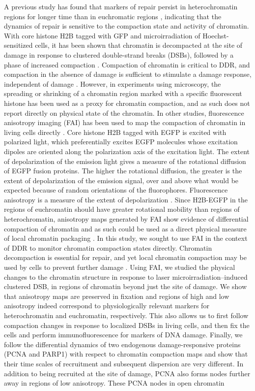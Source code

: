 A previous study has found that markers of repair persist in heterochromatin regions for longer time than in euchromatic regions \cite{goodarzi2008atm}, indicating that the dynamics of repair is sensitive to the compaction state and activity of chromatin. With core histone H2B tagged with GFP and microirradiation of Hoechst-sensitized cells, it has been shown that chromatin is decompacted at the site of damage in response to clustered double-strand breaks (DSBs), followed by a phase of increased compaction \cite{kruhlak2006changes,strickfaden2016poly}. Compaction of chromatin is critical to DDR, and compaction in the absence of damage is sufficient to stimulate a damage response, independent of damage \cite{BURGESS20141703}. However, in experiments using microscopy, the spreading or shrinking of a chromatin region marked with a specific fluorescent histone has been used as a proxy for chromatin compaction, and as such does not report directly on physical state of the chromatin. In other studies, fluorescence anisotropy imaging (FAI) has been used to map the compaction of chromatin in living cells directly \cite{banerjee2006chromatin}. Core histone H2B tagged with EGFP is excited with polarized light, which preferentially excites EGFP molecules whose excitation dipoles are oriented along the polarization axis of the excitation light. The extent of depolarization of the emission light gives a measure of the rotational diffusion of EGFP fusion proteins. The higher the rotational diffusion, the greater is the extent of depolarization of the emission signal, over and above what would be expected because of random orientations of the fluorophores. Fluorescence anisotropy is a measure of the extent of depolarization \cite{lakowicz2013principles,ghosh2012dynamic}. Since H2B-EGFP in the regions of euchromatin should have greater rotational mobility than regions of heterochromatin, anisotropy maps generated by FAI show evidence of differential compaction of chromatin and as such could be used as a direct physical measure of local chromatin packaging \cite{bhattacharya2009spatio}. In this study, we sought to use FAI in the context of DDR to monitor chromatin compaction states directly. Chromatin decompaction is essential for repair, and yet local chromatin compaction may be used by cells to prevent further damage \cite{BURGESS20141703}. Using FAI, we studied the physical changes to the chromatin structure in response to laser microirradiation–induced clustered DSB, in regions of chromatin beyond just the site of damage. We show that anisotropy maps are preserved in fixation and regions of high and low anisotropy indeed correspond to physiologically relevant markers for heterochromatin and euchromatin, respectively. This also allows us to first follow compaction changes in response to localized DSBs in living cells, and then fix the cells and perform immunofluorescence for markers of DNA damage. Finally, we follow the differential dynamics of two endogenous damage-responsive proteins (PCNA and PARP1) with respect to chromatin compaction maps and show that their time scales of recruitment and subsequent dispersion are very different. In addition to being recruited at the site of damage, PCNA also forms nodes further away in regions of low anisotropy. These PCNA nodes in open chromatin 